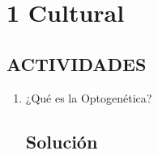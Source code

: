 \section{1 Cultural}

\subsection*{ACTIVIDADES}

\begin{enumerate}[label=\arabic*., leftmargin=*]
    \item ¿Qué es la Optogenética?
    \subsection*{Solución}
\end{enumerate}